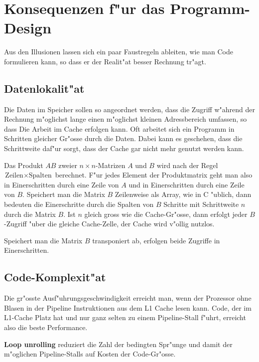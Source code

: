 \section{Konsequenzen f"ur das Programm-Design}
Aus den Illusionen lassen sich ein paar Faustregeln ableiten, wie man
Code formulieren kann, so dass er der Realit"at besser Rechnung tr"agt.

\subsection{Datenlokalit"at}
Die Daten im Speicher sollen so angeordnet werden, dass die Zugriff w"ahrend
der Rechnung m"oglichst lange einen m"oglichst kleinen Adressbereich umfassen,
so dass Die Arbeit im Cache erfolgen kann.
Oft arbeitet sich ein Programm in Schritten gleicher Gr"osse durch die
Daten.
Dabei kann es geschehen, dass die Schrittweite daf"ur sorgt, dass der
Cache gar nicht mehr genutzt werden kann.

\begin{beispiel}
Das Produkt $AB$ zweier $n\times n$-Matrizen $A$ und $B$ wird nach der Regel
$\text{Zeilen}\times \text{Spalten}$ berechnet. F"ur jedes Element
der Produktmatrix geht man also in Einerschritten durch eine Zeile
von $A$ und in Einerschritten durch eine Zeile von $B$.
Speichert man die Matrix $B$ Zeilenweise als Array, wie in C "ublich,
dann bedeuten die Einerschritte durch die Spalten von $B$ 
Schritte mit Schrittweite $n$ durch die Matrix $B$.
Ist $n$ gleich gross wie die Cache-Gr"osse, dann erfolgt jeder $B$-Zugriff
"uber die gleiche Cache-Zelle, der Cache wird v"ollig nutzlos.

Speichert man die Matrix $B$ transponiert ab, erfolgen beide Zugriffe
in Einerschritten.
\end{beispiel}


\subsection{Code-Komplexit"at}
Die gr"osste Ausf"uhrungsgeschwindigkeit erreicht man, wenn der
Prozessor ohne Blasen in der Pipeline Instruktionen aus dem
L1 Cache lesen kann. Code, der im L1-Cache Platz hat und nur ganz
selten zu einem Pipeline-Stall f"uhrt, erreicht also die beste
Performance.

{\bf Loop unrolling} reduziert die Zahl der bedingten Spr"unge und damit
der m"oglichen Pipeline-Stalls auf Kosten der Code-Gr"osse.

